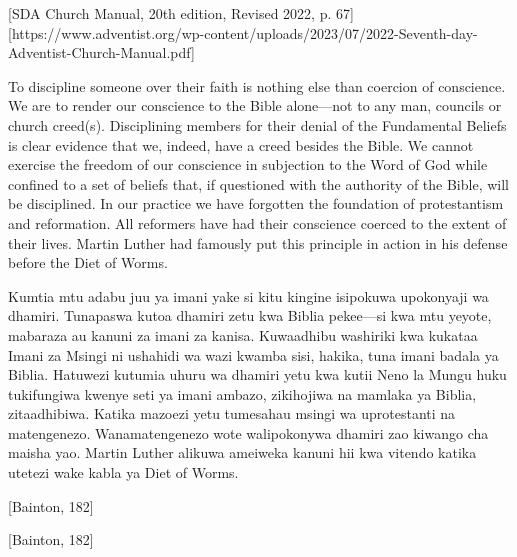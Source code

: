 [SDA Church Manual, 20th edition, Revised 2022, p. 67][https://www.adventist.org/wp-content/uploads/2023/07/2022-Seventh-day-Adventist-Church-Manual.pdf]


To discipline someone over their faith is nothing else than coercion of conscience. We are to render our conscience to the Bible alone—not to any man, councils or church creed(s). Disciplining members for their denial of the Fundamental Beliefs is clear evidence that we, indeed, have a creed besides the Bible. We cannot exercise the freedom of our conscience in subjection to the Word of God while confined to a set of beliefs that, if questioned with the authority of the Bible, will be disciplined. In our practice we have forgotten the foundation of protestantism and reformation. All reformers have had their conscience coerced to the extent of their lives. Martin Luther had famously put this principle in action in his defense before the Diet of Worms.


Kumtia mtu adabu juu ya imani yake si kitu kingine isipokuwa upokonyaji wa dhamiri. Tunapaswa kutoa dhamiri zetu kwa Biblia pekee—si kwa mtu yeyote, mabaraza au kanuni za imani za kanisa. Kuwaadhibu washiriki kwa kukataa Imani za Msingi ni ushahidi wa wazi kwamba sisi, hakika, tuna imani badala ya Biblia. Hatuwezi kutumia uhuru wa dhamiri yetu kwa kutii Neno la Mungu huku tukifungiwa kwenye seti ya imani ambazo, zikihojiwa na mamlaka ya Biblia, zitaadhibiwa. Katika mazoezi yetu tumesahau msingi wa uprotestanti na matengenezo. Wanamatengenezo wote walipokonywa dhamiri zao kiwango cha maisha yao. Martin Luther alikuwa ameiweka kanuni hii kwa vitendo katika utetezi wake kabla ya Diet of Worms.


[Bainton, 182]


[Bainton, 182]


